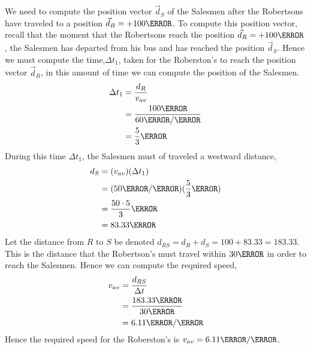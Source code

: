 \documentclass[12pt]{article} %
\begin{document}
\begin{qstn}[8]
\begin{soln}
    We need to compute the position vector $\vec d_S$ of the Salesmen after the Robertsons have traveled to a position $\vec d_R = +100\m$. To compute this position vector, recall that the moment that the Robertsons reach the position $\vec d_R = +100\m$, the Salesmen has departed from his bus and has reached the position $\vec d_S$. Hence we must compute the time,$\Delta t_1$, taken for the Roberston's to reach the position vector $\vec d_R$, in this amount of time we can compute the position of the Salesmen.
    \begin{align*}
        \Delta t_1 &= \frac{d_R}{v_{av}}\\
        &= \frac{100\m}{60\m / \s}\\
        &= \frac{5}{3} \s
    \end{align*}
    During this time $\Delta t_1$, the Salesmen must of traveled a westward distance,
    \begin{align*}
        d_S &= (v_{av})(\Delta t_1)\\
        &= (50 \m / \s)(\frac{5}{3} \s)\\
        &= \frac{50 \cdot 5}{3}\m \\
        &= 83.33\m
    \end{align*}
    Let the distance from $R$ to $S$ be denoted $d_{RS} = d_R + d_S = 100 + 83.33 = 183.33$. This is the distance that the Robertson's must travel within $30\s$ in order to reach the Salesmen. Hence we can compute the required speed,
    \begin{align*}
        v_{av} &= \frac{d_{RS}}{\Delta t}\\
        &= \frac{183.33\m}{30\s}\\
        &= 6.11 \m / \s
    \end{align*}
    Hence the required speed for the Roberston's is $v_{av} = 6.11 \m / \s$.


    \end{soln}


    \end{qstn}

    
\end{document}
